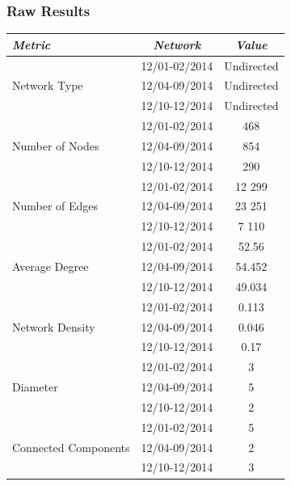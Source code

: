 \documentclass{llncs}
\begin{document}
\subsubsection{Raw Results}
\begin{center}
    \begin{tabular}{ l | c | c }
        \hline
        \textit{Metric} & \textit{Network} & \textit{Value} \\ \hline
        \multirow{3}{*}{Network Type} & 12/01-02/2014 & Undirected \\
                                      & 12/04-09/2014 & Undirected \\
                                      & 12/10-12/2014 & Undirected \\ \hline
        \multirow{3}{*}{Number of Nodes} & 12/01-02/2014 & 468 \\
                                      & 12/04-09/2014 & 854 \\
                                      & 12/10-12/2014 & 290 \\ \hline
        \multirow{3}{*}{Number of Edges} & 12/01-02/2014 & 12 299 \\
                                      & 12/04-09/2014 & 23 251 \\
                                      & 12/10-12/2014 & 7 110 \\ \hline
        \multirow{3}{*}{Average Degree} & 12/01-02/2014 & 52.56 \\
                                      & 12/04-09/2014 & 54.452 \\
                                      & 12/10-12/2014 & 49.034 \\ \hline
        \multirow{3}{*}{Network Density} & 12/01-02/2014 & 0.113 \\
                                      & 12/04-09/2014 & 0.046 \\
                                      & 12/10-12/2014 & 0.17 \\ \hline
        \multirow{3}{*}{Diameter} & 12/01-02/2014 & 3 \\
                                      & 12/04-09/2014 & 5 \\
                                      & 12/10-12/2014 & 2 \\ \hline
        \multirow{3}{*}{Connected Components} & 12/01-02/2014 & 5 \\
                                      & 12/04-09/2014 & 2 \\
                                      & 12/10-12/2014 & 3 \\ \hline
    \end{tabular}
\end{center}
%
\end{document}
